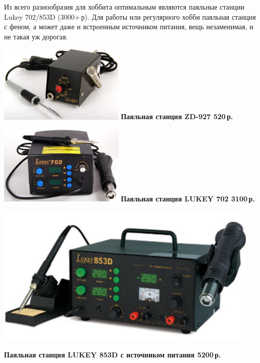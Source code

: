 
Из всего разнообразия для хоббита оптимальным являются паяльные станции Lukey
702/853D (3000+\,р). Для работы или регулярного хобби паяльная станция с феном,
а может даже и встроенным источником питания, вещь незаменимая, и не такая уж
дорогая.

\includegraphics[width=0.45\textwidth]{tech/tools/solder/ZD927.jpg}
\textbf{Паяльная станция ZD-927 520\,р.}

\includegraphics[width=0.45\textwidth]{tech/tools/solder/Lukey702.jpg}
\textbf{Паяльная станция LUKEY 702 3100\,р.}

\clearpage
\includegraphics[width=0.95\textwidth]{tech/tools/solder/Lukey853D.jpg}

\textbf{Паяльная станция LUKEY 853D с источником питания 5200\,р.}

\secup
